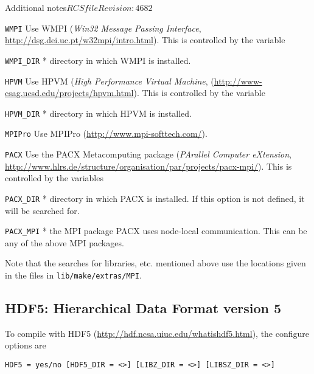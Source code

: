 \begin{cactuspart}{Additional notes}{$RCSfile$}{$Revision: 4682 $}
\begin{Lentry}
\item[\texttt{WMPI}]
Use WMPI (\textit{Win32 Message Passing Interface}, \url{http://dsg.dei.uc.pt/w32mpi/intro.html}). This is controlled by the variable
  \begin{Lentry}
  \item[\texttt{WMPI\_DIR}] * directory in which WMPI is installed.
  \end{Lentry}

\item[\texttt{HPVM}]
Use HPVM (\textit{High Performance Virtual Machine},
(\url{http://www-csag.ucsd.edu/projects/hpvm.html}).
This is controlled by the variable
  \begin{Lentry}
  \item[\texttt{HPVM\_DIR}] * directory in which HPVM is installed.
  \end{Lentry}

\item[\texttt{MPIPro}]
Use MPIPro (\url{http://www.mpi-softtech.com/}).

\item[\texttt{PACX}]
Use the PACX Metacomputing package (\textit{PArallel Computer eXtension},\\
\url{http://www.hlrs.de/structure/organisation/par/projects/pacx-mpi/}). This is controlled by the variables
  \begin{Lentry}
  \item[\texttt{PACX\_DIR}] * directory in which PACX is installed.
        If this option is not defined, it will be searched for.
  \item[\texttt{PACX\_MPI}] * the MPI package PACX uses node-local
        communication. This can be any of the above MPI packages.
  \end{Lentry}

\end{Lentry}

Note that the searches for libraries, etc. mentioned above use the
locations given in the files in \texttt{lib/make/extras/MPI}.

\subsection{HDF5: Hierarchical Data Format version 5}
\label{subsec:hdf5}

To compile with HDF5 (\url{http://hdf.ncsa.uiuc.edu/whatishdf5.html}),
the configure options are

\texttt{HDF5 = yes/no [HDF5\_DIR = <>] [LIBZ\_DIR = <>] [LIBSZ\_DIR = <>]}


\end{cactuspart}
